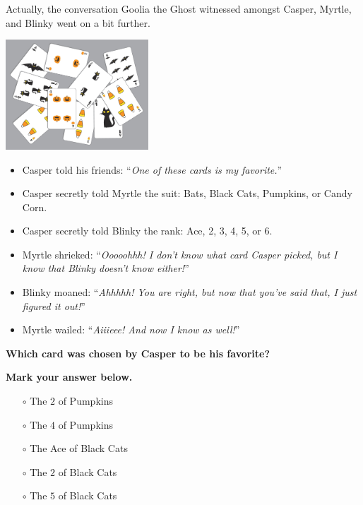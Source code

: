 


Actually, the conversation Goolia the Ghost witnessed amongst
Casper, Myrtle, and Blinky went on a bit further.

\begin{center}
    \includegraphics[width=0.4\textwidth]{assets/kat/cardstogeth}
\end{center}

\begin{itemize}
  \item Casper told his friends:
        ``\textit{One of these cards is my favorite.}''
  \item Casper secretly told Myrtle the suit:
        Bats, Black Cats, Pumpkins, or Candy Corn.
  \item Casper secretly told Blinky the rank:
        Ace, 2, 3, 4, 5, or 6.
  \item Myrtle shrieked:
        ``\textit{Ooooohhh! I don't know what card Casper picked, but I know
        that Blinky doesn't know either!}''
  \item Blinky moaned:
        ``\textit{Ahhhhh! You are right, but now that you've said that,
        I just figured it out!}''
  \item Myrtle wailed:
        ``\textit{Aiiieee! And now I know as well!}''
\end{itemize}

\textbf{Which card was chosen by Casper to be his favorite?}

\vspace{2em}

\textbf{Mark your answer below.}

\begin{itemize}
  \item[\Huge\(\circ\)] The \(2\) of Pumpkins
  \item[\Huge\(\circ\)] The \(4\) of Pumpkins
  \item[\Huge\(\circ\)] The Ace of Black Cats
  \item[\Huge\(\circ\)] The \(2\) of Black Cats
  \item[\Huge\(\circ\)] The \(5\) of Black Cats
\end{itemize}

